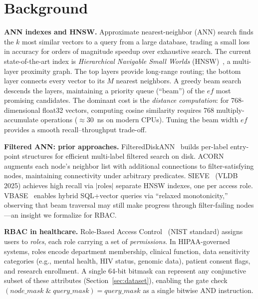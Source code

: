 \section{Background}
\label{sec:background}

\noindent\textbf{ANN indexes and HNSW.}
Approximate nearest-neighbor (ANN) search finds the $k$ most similar vectors
to a query from a large database, trading a small loss in accuracy for orders
of magnitude speedup over exhaustive search.
The current state-of-the-art index is \emph{Hierarchical Navigable Small
Worlds} (HNSW)~\cite{malkov2020efficient}, a multi-layer proximity graph.
The top layers provide long-range routing; the bottom layer connects every
vector to its $M$ nearest neighbors.
A greedy beam search descends the layers, maintaining a priority queue
(``beam'') of the $\mathit{ef}$ most promising candidates.
The dominant cost is the \emph{distance computation}: for 768-dimensional
float32 vectors, computing cosine similarity requires 768 multiply-accumulate
operations ($\approx\!30$~ns on modern CPUs).
Tuning the beam width $\mathit{ef}$ provides a smooth recall--throughput
trade-off.

\smallskip
\noindent\textbf{Filtered ANN: prior approaches.}
FilteredDiskANN~\cite{gollapudi2023filtered} builds per-label entry-point
structures for efficient multi-label filtered search on disk.
ACORN~\cite{patel2024acorn} augments each node's neighbor list with additional
connections to filter-satisfying nodes, maintaining connectivity under arbitrary
predicates.
SIEVE~\cite{zhang2025sieve} (VLDB 2025) achieves high recall via $|\text{roles}|$
separate HNSW indexes, one per access role.
VBASE~\cite{zhang2023vbase} enables hybrid SQL+vector queries via
``relaxed monotonicity,'' observing that beam traversal may still make
progress through filter-failing nodes---an insight we formalize for RBAC.

\smallskip
\noindent\textbf{RBAC in healthcare.}
Role-Based Access Control~\cite{ferraiolo2001proposed} (NIST standard)
assigns users to \emph{roles}, each role carrying a set of \emph{permissions}.
In HIPAA-governed systems, roles encode department membership, clinical
function, data sensitivity categories (e.g., mental health, HIV status,
genomic data), patient consent flags, and research enrollment.
A single 64-bit bitmask can represent any conjunctive subset of these
attributes (Section~\ref{sec:dataset}), enabling the gate check
$(\mathit{node\_mask} \;\&\; \mathit{query\_mask}) = \mathit{query\_mask}$
as a single bitwise AND instruction.
